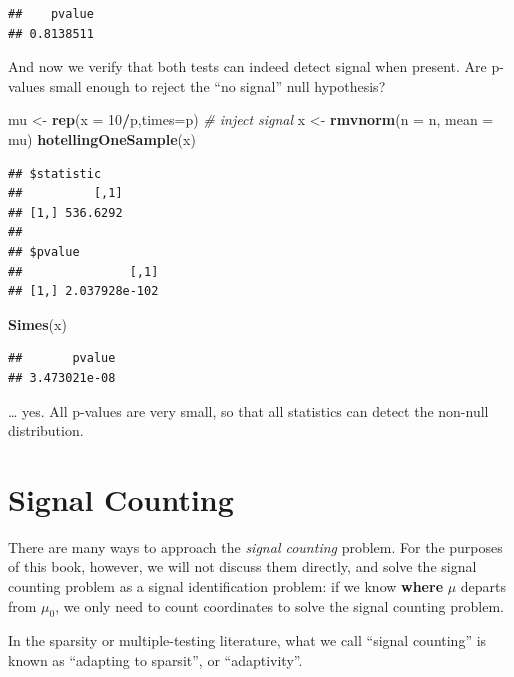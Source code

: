 \documentclass[]{book}
\newenvironment{Shaded}{\begin{snugshade}}{\end{snugshade}}
\newcommand{\CommentTok}[1]{\textcolor[rgb]{0.56,0.35,0.01}{\textit{#1}}}
\newcommand{\DataTypeTok}[1]{\textcolor[rgb]{0.13,0.29,0.53}{#1}}
\newcommand{\DecValTok}[1]{\textcolor[rgb]{0.00,0.00,0.81}{#1}}
\newcommand{\KeywordTok}[1]{\textcolor[rgb]{0.13,0.29,0.53}{\textbf{#1}}}
\newcommand{\NormalTok}[1]{#1}
\newcommand{\OperatorTok}[1]{\textcolor[rgb]{0.81,0.36,0.00}{\textbf{#1}}}
\newcommand{\StringTok}[1]{\textcolor[rgb]{0.31,0.60,0.02}{#1}}
\theoremstyle{definition}
\theoremstyle{definition}
\theoremstyle{definition}
\theoremstyle{remark}
\let\BeginKnitrBlock\begin \let\EndKnitrBlock\end
\begin{document}
\begin{verbatim}
##    pvalue 
## 0.8138511
\end{verbatim}

And now we verify that both tests can indeed detect signal when present. Are p-values small enough to reject the ``no signal'' null hypothesis?

\begin{Shaded}
\begin{Highlighting}[]
\NormalTok{mu <-}\StringTok{ }\KeywordTok{rep}\NormalTok{(}\DataTypeTok{x =} \DecValTok{10}\OperatorTok{/}\NormalTok{p,}\DataTypeTok{times=}\NormalTok{p) }\CommentTok{# inject signal}
\NormalTok{x <-}\StringTok{ }\KeywordTok{rmvnorm}\NormalTok{(}\DataTypeTok{n =}\NormalTok{ n, }\DataTypeTok{mean =}\NormalTok{ mu)}
\KeywordTok{hotellingOneSample}\NormalTok{(x)}
\end{Highlighting}
\end{Shaded}

\begin{verbatim}
## $statistic
##          [,1]
## [1,] 536.6292
## 
## $pvalue
##               [,1]
## [1,] 2.037928e-102
\end{verbatim}

\begin{Shaded}
\begin{Highlighting}[]
\KeywordTok{Simes}\NormalTok{(x)}
\end{Highlighting}
\end{Shaded}

\begin{verbatim}
##       pvalue 
## 3.473021e-08
\end{verbatim}

\ldots{} yes. All p-values are very small, so that all statistics can detect the non-null distribution.

\hypertarget{signal-counting}{%
\section{Signal Counting}\label{signal-counting}}

There are many ways to approach the \emph{signal counting} problem.
For the purposes of this book, however, we will not discuss them directly, and solve the signal counting problem as a signal identification problem: if we know \textbf{where} \(\mu\) departs from \(\mu_0\), we only need to count coordinates to solve the signal counting problem.

\BeginKnitrBlock{remark}
{}In the sparsity or multiple-testing literature, what we call ``signal counting'' is known as ``adapting to sparsit'', or ``adaptivity''.
\EndKnitrBlock{remark}
\end{document}
